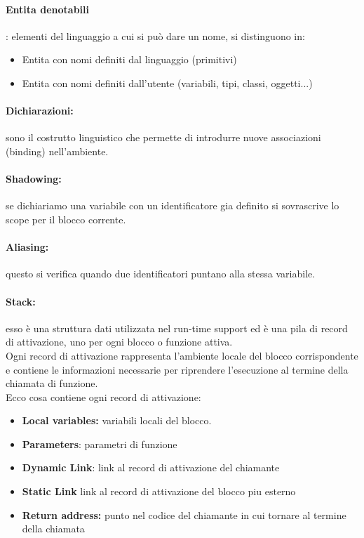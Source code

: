 \documentclass[12pt,a4paper]{article}
\begin{document}
\paragraph{Entita denotabili}: elementi del linguaggio a cui si può dare un nome, si distinguono in:
\begin{itemize}
  \item Entita con nomi definiti dal linguaggio (primitivi)
  \item Entita con nomi definiti dall'utente (variabili, tipi, classi, oggetti...)
\end{itemize}
\paragraph{Dichiarazioni:} sono il costrutto linguistico che permette di introdurre nuove associazioni (binding) nell'ambiente.
\paragraph{Shadowing:} se dichiariamo una variabile con un identificatore gia definito si sovrascrive lo scope per il blocco corrente.
\paragraph{Aliasing:} questo si verifica quando due identificatori puntano alla stessa variabile.
\paragraph{Stack:} esso è una struttura dati utilizzata nel run-time support ed  è una pila di record di attivazione, uno per ogni blocco o funzione attiva.\\
Ogni record di attivazione rappresenta l'ambiente locale del blocco corrispondente e contiene le informazioni necessarie per riprendere l'esecuzione al termine della chiamata di funzione.\\
Ecco cosa contiene ogni record di attivazione:
\begin{itemize}
  \item \textbf{Local variables:} variabili locali del blocco.
  \item \textbf{Parameters}: parametri di funzione
  \item \textbf{Dynamic Link}: link al record di attivazione del chiamante
  \item \textbf{Static Link} link al record di attivazione del blocco piu esterno
  \item \textbf{Return address:} punto nel codice del chiamante in cui tornare al termine della chiamata
\end{itemize}
\end{document}
